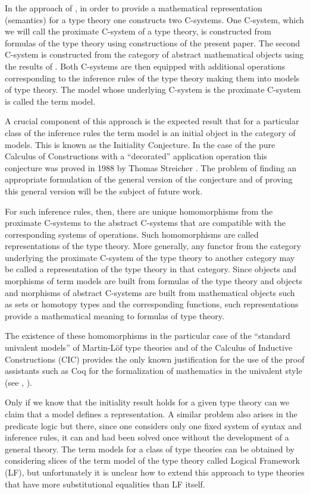 \documentclass[11pt]{article}
\begin{document}
In the approach of \cite{CMUtalk}, in order to provide a mathematical representation (semantics) for a type theory one constructs two C-systems. One C-system, which we will call the proximate C-system of a type theory, is constructed from formulas of the type theory using constructions of the present paper.  The second C-system is constructed from the category of abstract mathematical objects using the results of \cite{Cfromauniverse}. Both C-systems are then equipped with additional operations corresponding to the inference rules of the type theory making them into models of type theory.  The model whose underlying C-system is the proximate C-system is called the term model. 

A crucial component of this approach is the expected result that for a particular class of the inference rules the term model is an initial object in the category of models. This is known as the Initiality Conjecture. In the case of the pure Calculus of Constructions with a ``decorated''  application operation this conjecture was proved in 1988 by Thomas Streicher \cite{Streicher}. The problem of finding an appropriate formulation of the general version of the conjecture and of proving this general version will be the subject of future work. 

For such inference rules, then, there are unique homomorphisms from the proximate C-systems to the abstract C-systems that are compatible with the corresponding systems of operations. Such homomorphisms are called representations of the type theory. More generally, any functor from the category underlying the proximate C-system of the type theory to another category may be called a representation of the type theory in that category. Since objects and morphisms of term models are built from formulas of the type theory and objects and morphisms of abstract C-systems are built from mathematical objects such as sets or homotopy types and the corresponding functions, such representations provide a mathematical meaning to formulas of type theory. 

The existence of these homomorphisms in the particular case of the ``standard univalent models'' of  Martin-L\"{o}f type theories and of the Calculus of Inductive Constructions (CIC) provides the only known justification for the use of the proof assistants such as Coq for the formalization of mathematics in the univalent style (see \cite{UniMath}, \cite{UniMath2015}). 

Only if we know that the initiality result holds for a given type theory can we claim that a model defines a representation. A similar problem also arises in the predicate logic but there, since one considers only one fixed system of syntax and inference rules, it can and had been solved once without the development of a general theory. The term models for a class of type theories can be obtained by considering slices of the term model of the type theory called Logical Framework (LF), but unfortunately it is unclear how to extend this approach to type theories that have more substitutional equalities than LF itself.
\end{document}
